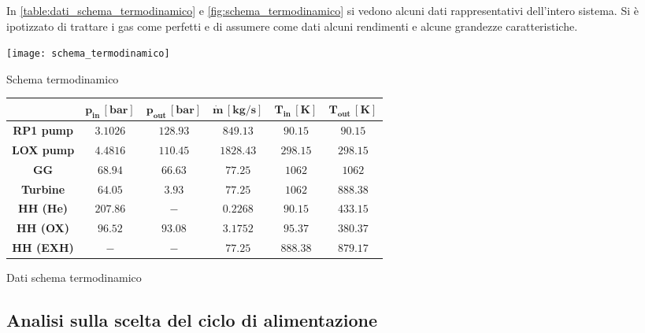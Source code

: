 In \autoref{table:dati_schema_termodinamico} e \autoref{fig:schema_termodinamico} si vedono alcuni dati rappresentativi dell'intero sistema. Si è ipotizzato di trattare i gas come perfetti e di assumere come dati alcuni rendimenti e alcune grandezze caratteristiche.

\begin{minipage}{0.4\linewidth}
    \centering
    \captionsetup{type=figure}
    \texttt{[image: schema\_termodinamico]}
    \caption{Schema termodinamico}
    \label{fig:schema_termodinamico}
\end{minipage}\hfill
\begin{minipage}{0.6\linewidth}
    \centering
    \captionsetup{type=table}
    \scriptsize
    \renewcommand{\arraystretch}{2}
    \setlength\extrarowheight{-1pt}
    \begin{tabular}{|c|c|c|c|c|c|}
        \hline
        & $\bm{p_{in} \, [bar]}$ & $\bm{p_{out} \, [bar]}$ & $\bm{\dot{m} \, [kg/s]}$ & $\bm{T_{in} \, [K]}$ & $\bm{T_{out} \, [K]}$ \\
        \hline
        \textbf{RP1 pump} & $3.1026$ & $128.93$ & $849.13$ & $90.15$ & $90.15$ \\
        \hline
        \textbf{LOX pump} & $4.4816$ & $110.45$ & $1828.43$ & $298.15$ & $298.15$ \\
        \hline
        \textbf{GG} & $68.94$ & $66.63$ & $77.25$ & $1062$ & $1062$ \\
        \hline
        \textbf{Turbine} & $64.05$ & $3.93$ & $77.25$ & $1062$ & $888.38$ \\
        \hline
        \textbf{HH (He)} & $207.86$ & $-$ & $0.2268$ & $90.15$ & $433.15$ \\
        \hline
        \textbf{HH (OX)} & $96.52$ & $93.08$ & $3.1752$ & $95.37$ & $380.37$ \\
        \hline
        \textbf{HH (EXH)} & $-$ & $-$ & $77.25$ & $888.38$ & $879.17$ \\
        \hline
    \end{tabular}
    \caption{Dati schema termodinamico \cite{gg_manual}\cite{turbine_design}\cite{engine_manual}}
    \label{table:dati_schema_termodinamico}
\end{minipage}

\subsection{Analisi sulla scelta del ciclo di alimentazione}
\label{subsec:analisi ciclo alimentazione}

